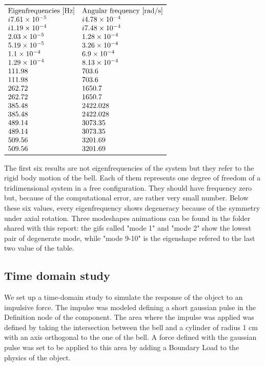 \documentclass[a4paper]{article}
\begin{document}
\begin{table}[h]
	\centering
	$\begin{array}{ll}
		\toprule
		\text{Eigenfrequencies [Hz]} & \text{Angular frequency [rad/s]}\\
				i7.61\times 10^{-5} & i4.78\times 10^{-4} \\
		i1.19\times 10^{-4} &  i7.48\times 10^{-4} \\
		2.03\times 10^{-5} & 1.28\times 10^{-4} \\
		5.19\times 10^{-5} & 3.26\times 10^{-4} \\
		1.1\times 10^{-4} & 6.9\times 10^{-4} \\
		1.29\times 10^{-4} & 8.13\times 10^{-4}  \\
		111.98  &  703.6 \\
		111.98  &  703.6 \\
		262.72 &   1650.7\\ 
		262.72 &   1650.7\\  
		385.48 &   2422.028 \\   
		385.48 &   2422.028 \\ 
		489.14 &  3073.35 \\
     	489.14 &  3073.35 \\
     	509.56  &  3201.69 \\
     	509.56  &  3201.69 \\
		\bottomrule
	\end{array}$
\caption{}
\label{tab:freq}
\end{table}

The first six results are not eigenfrequencies of the system but they refer to the rigid body motion of the bell. Each of them represents one degree of freedom of a tridimensional system in a free configuration. They should have frequency zero but, because of the computational error, are rather very small number. Below these six values, every eigenfrequency shows degeneracy because of the symmetry under axial rotation. Three modeshapes animations can be found in the folder shared with this report: the gifs called "mode 1" and "mode 2" show the lowest pair of degenerate mode, while "mode 9-10" is the eigenshape refered to the last two value of the table. 


\subsection{Time domain study}
We set up a time-domain study to simulate the response of the object to an impulsive force. The impulse was modeled defining a short gaussian pulse in the Definition node of the component.  The area where the impulse was applied was defined by taking the intersection between the bell and a cylinder of radius 1 cm with an axis orthogonal to the one of the bell. A force defined with the gaussian pulse was set to be applied to this area by adding a Boundary Load to the physics of the object.
\end{document}
